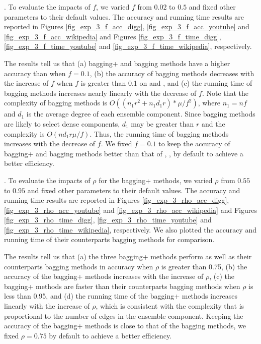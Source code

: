 . To evaluate the impacts of $f$, we
varied $f$ from $0.02$ to $0.5$ and fixed other parameters to their
default values. The accuracy and running time results are reported in
Figures \ref{fig_exp_3_f_acc_digg}, \ref{fig_exp_3_f_acc_youtube} and \ref{fig_exp_3_f_acc_wikipedia} and
Figures \ref{fig_exp_3_f_time_digg}, \ref{fig_exp_3_f_time_youtube} and \ref{fig_exp_3_f_time_wikipedia}, respectively.



The results tell us that (a) bagging+ and bagging methods have a higher accuracy
than \NMF when $f = 0.1$, (b) the accuracy of bagging methods decreases
with the increase of $f$ when $f$ is greater than 0.1 on \Digg and \Wikipedia,
and (c) the running time of bagging methods increases
nearly linearly with the decrease of $f$. Note that the complexity of bagging methods is
$O((n_{1}r^2 + n_{1}d_{1}r)*\mu /f^2)$, where $n_1 = nf$ and $d_1$ is the average degree of
each ensemble component. Since bagging methods are likely to select dense components, $d_1$
may be greater than $r$ and the complexity is $O(nd_1r\mu /f)$. Thus, the running time
of bagging methods increases with the decrease of $f$. We fixed $f = 0.1$ to keep the accuracy of bagging+ and bagging
methods better than that of \NMF, , by default to achieve a better efficiency.




. To evaluate the impacts of $\rho$ for
the bagging+ methods, we varied $\rho$ from $0.55$ to $0.95$ and
fixed other parameters to their default values. The accuracy and
running time results are reported in
Figures \ref{fig_exp_3_rho_acc_digg}, \ref{fig_exp_3_rho_acc_youtube} and \ref{fig_exp_3_rho_acc_wikipedia} and
Figures \ref{fig_exp_3_rho_time_digg}, \ref{fig_exp_3_rho_time_youtube} and \ref{fig_exp_3_rho_time_wikipedia}, respectively.
We also plotted the accuracy and running time of their counterparts
bagging methods for comparison.

The results tell us that (a) the three bagging+ methods perform
as well as their counterparts bagging methods in accuracy when
$\rho$ is greater than 0.75, (b) the accuracy of the bagging+ methods
increases with the increase of $\rho$, (c) the bagging+ methods are faster
than their counterparts bagging methods when $\rho$ is less than 0.95,
and (d) the running time of the bagging+ methods increases linearly
with the increase of $\rho$, which is consistent with
the complexity that is proportional to the number of edges in the
ensemble component. Keeping the accuracy of the bagging+ methods is close to
that of the bagging methods, we fixed $\rho = 0.75$ by default to achieve a better efficiency.



